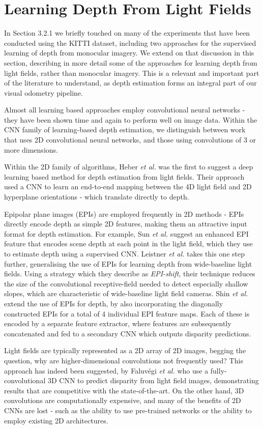 \section{Learning Depth From Light Fields}

In Section 3.2.1 we briefly touched on many of the experiments that have been conducted using the KITTI dataset, including two approaches for the supervised learning of depth from monocular imagery. We extend on that discussion in this section, describing in more detail some of the approaches for learning depth from light fields, rather than monocular imagery. This is a relevant and important part of the literature to understand, as depth estimation forms an integral part of our visual odometry pipeline. 

Almost all learning based approaches employ convolutional neural networks - they have been shown time and again to perform well on image data. Within the CNN family of learning-based depth estimation, we distinguish between work that uses 2D convolutional neural networks, and those using convolutions of 3 or more dimensions. 

Within the 2D family of algorithms, Heber \textit{et al.} \cite{heber2017shape} was the first to suggest a deep learning based method for depth estimation from light fields. Their approach used a CNN to learn an end-to-end mapping between the 4D light field and 2D hyperplane orientations - which translate directly to depth. 

Epipolar plane images (EPIs) are employed frequently in 2D methods - EPIs directly encode depth as simple 2D features, making them an attractive input format for depth estimation. For example, Sun \textit{et al.} \cite{sun2016lfdepthcnn} suggest an enhanced EPI feature that encodes scene depth at each point in the light field, which they use to estimate depth using a supervised CNN. Leistner \textit{et al.} \cite{leistner2019lfdepthcnn} takes this one step further, generalising the use of EPIs for learning depth from wide-baseline light fields. Using a strategy which they describe as \textit{EPI-shift}, their technique reduces the size of the convolutional receptive-field needed to detect especially shallow slopes, which are characteristic of wide-baseline light field cameras. Shin \textit{et al.} \cite{shin2018epinet} extend the use of EPIs for depth, by also incorporating the diagonally constructed EPIs for a total of 4 individual EPI feature maps. Each of these is encoded by a separate feature extractor, where features are subsequently concatenated and fed to a secondary CNN which outputs disparity predictions. 

Light fields are typically represented as a 2D array of 2D images, begging the question, why are higher-dimensional convolutions not frequently used? This approach has indeed been suggested, by Faluvégi \textit{et al.} \cite{faluvegi2019threedcnn} who use a fully-convolutional 3D CNN to predict disparity from light field images, demonstrating results that are competitive with the state-of-the-art. On the other hand, 3D convolutions are computationally expensive, and many of the benefits of 2D CNNs are lost - such as the ability to use pre-trained networks or the ability to employ existing 2D architectures. 